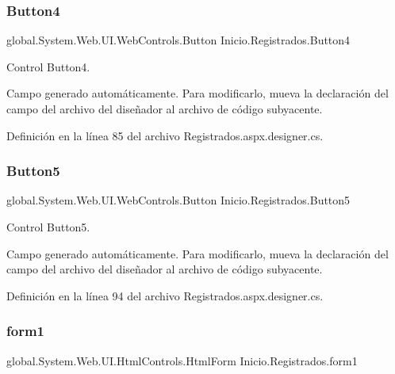\subsubsection{\texorpdfstring{Button4}{Button4}}
{\footnotesize\ttfamily global.\+System.\+Web.\+U\+I.\+Web\+Controls.\+Button Inicio.\+Registrados.\+Button4\hspace{0.3cm}{\ttfamily [protected]}}



Control Button4. 

Campo generado automáticamente. Para modificarlo, mueva la declaración del campo del archivo del diseñador al archivo de código subyacente. 

Definición en la línea 85 del archivo Registrados.\+aspx.\+designer.\+cs.

\mbox{\label{classInicio_1_1Registrados_a07302395de09db810ad8f7f096762449}} 
\subsubsection{\texorpdfstring{Button5}{Button5}}
{\footnotesize\ttfamily global.\+System.\+Web.\+U\+I.\+Web\+Controls.\+Button Inicio.\+Registrados.\+Button5\hspace{0.3cm}{\ttfamily [protected]}}



Control Button5. 

Campo generado automáticamente. Para modificarlo, mueva la declaración del campo del archivo del diseñador al archivo de código subyacente. 

Definición en la línea 94 del archivo Registrados.\+aspx.\+designer.\+cs.

\mbox{\label{classInicio_1_1Registrados_a902f9075b41d6386d17242fe32dea6e4}} 
\subsubsection{\texorpdfstring{form1}{form1}}
{\footnotesize\ttfamily global.\+System.\+Web.\+U\+I.\+Html\+Controls.\+Html\+Form Inicio.\+Registrados.\+form1\hspace{0.3cm}{\ttfamily [protected]}}



